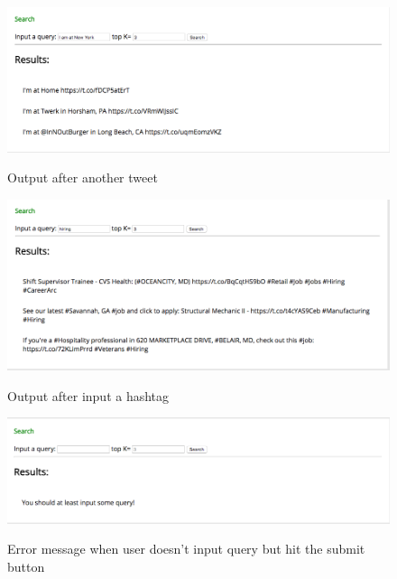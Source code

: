 \documentclass[10pt]{article}
\begin{document}
\begin{itemize}
\begin{figure}[H]
	\caption{Output after another tweet}
	\centering
	\includegraphics[scale=0.3]{Screen_Shot_3.png}
	\label{fig3}
\end{figure}

\begin{figure}[H]
	\caption{Output after input a hashtag}
	\centering
	\includegraphics[scale=0.3]{Screen_Shot_4.png}
	\label{fig4}
\end{figure}

\begin{figure}[H]
	\caption{Error message when user doesn't input query but hit the submit button }
	\centering
	\includegraphics[scale=0.3]{Screen_Shot_5.png}
	\label{fig5}
\end{figure}


\end{itemize}
\end{document}
